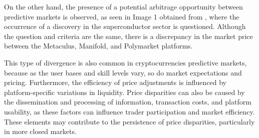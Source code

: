 On the other hand, the presence of a potential arbitrage opportunity between predictive markets is observed, as seen in Image 1 obtained from \citeauthor{lPolack}, where the occurrence of a discovery in the superconductor sector is questioned. Although the question and criteria are the same, there is a discrepancy in the market price between the Metaculus, Manifold, and Polymarket platforms.

    \begin{center}
    \end{center}

This type of divergence is also common in cryptocurrencies predictive markets, because as the user bases and skill levels vary, so do market expectations and pricing. Furthermore, the efficiency of price adjustments is influenced by platform-specific variations in liquidity. Price disparities can also be caused by the dissemination and processing of information, transaction costs, and platform usability, as these factors can influence trader participation and market efficiency. These elements may contribute to the persistence of price disparities, particularly in more closed markets.
